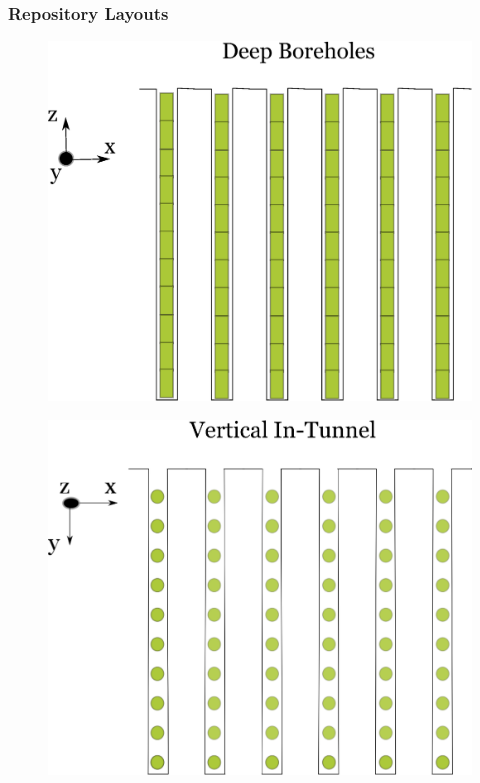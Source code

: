\begin{frame}
  \frametitle{Repository Layouts}
  \begin{minipage}{0.3\textwidth}
    \begin{figure}[h!]
      \includegraphics[width=\textwidth]{boreholes.eps}
    \end{figure}
    \begin{figure}[h!]
      \includegraphics[width=\textwidth]{vertical.eps}
    \end{figure}
  \end{minipage}

\end{frame}
